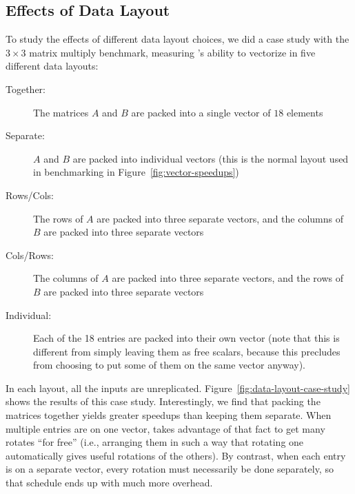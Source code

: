 \subsection{Effects of Data Layout}\label{sec:effects-of-data-layout}
To study the effects of different data layout choices, we did a case study with the $3\times 3$ matrix multiply benchmark, measuring \system's ability to vectorize in five different data layouts:
\begin{description}
    \item[Together:] The matrices $A$ and $B$ are packed into a single vector of $18$ elements
    \item[Separate:] $A$ and $B$ are packed into individual vectors (this is the normal layout used in benchmarking in Figure~\ref{fig:vector-speedups})
    \item[Rows/Cols:] The rows of $A$ are packed into three separate vectors, and the columns of $B$ are packed into three separate vectors
    \item[Cols/Rows:] The columns of $A$ are packed into three separate vectors, and the rows of $B$ are packed into three separate vectors
    \item[Individual:] Each of the 18 entries are packed into their own vector (note that this is different from simply leaving them as free scalars, because this precludes \system from choosing to put some of them on the same vector anyway).     
\end{description}
In each layout, all the inputs are unreplicated.
Figure~\ref{fig:data-layout-case-study} shows the results of this case study.
Interestingly, we find that packing the matrices together yields greater speedups than keeping them separate.
When multiple entries are on one vector, \system takes advantage of that fact to get many rotates ``for free'' (i.e., arranging them in such a way that rotating one automatically gives useful rotations of the others).
By contrast, when each entry is on a separate vector, every rotation must necessarily be done separately, so that schedule ends up with much more overhead.

